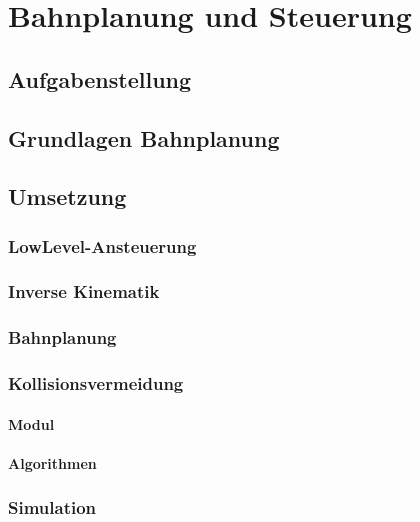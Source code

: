 
\chapter{Bahnplanung und Steuerung}


\section{Aufgabenstellung}


\section{Grundlagen Bahnplanung}


\section{Umsetzung}

\subsection{LowLevel-Ansteuerung}

\subsection{Inverse Kinematik}

\subsection{Bahnplanung}

\subsection{Kollisionsvermeidung}

\subsubsection{Modul}

\subsubsection{Algorithmen}


\subsection{Simulation}
